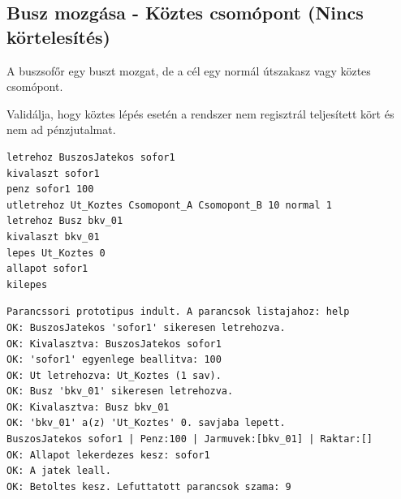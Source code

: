 \subsection{Busz mozgása - Köztes csomópont (Nincs körtelesítés)}
\begin{test-case-description}
    A buszsofőr egy buszt mozgat, de a cél egy normál útszakasz vagy köztes csomópont.
\end{test-case-description}
\begin{test-case-function}
    Validálja, hogy köztes lépés esetén a rendszer nem regisztrál teljesített kört és nem ad pénzjutalmat.
\end{test-case-function}
\begin{test-case-input}
\begin{verbatim}
letrehoz BuszosJatekos sofor1
kivalaszt sofor1
penz sofor1 100
utletrehoz Ut_Koztes Csomopont_A Csomopont_B 10 normal 1
letrehoz Busz bkv_01
kivalaszt bkv_01
lepes Ut_Koztes 0
allapot sofor1
kilepes
\end{verbatim}
\end{test-case-input}
\begin{test-case-output}
\begin{verbatim}
Parancssori prototipus indult. A parancsok listajahoz: help
OK: BuszosJatekos 'sofor1' sikeresen letrehozva.
OK: Kivalasztva: BuszosJatekos sofor1
OK: 'sofor1' egyenlege beallitva: 100
OK: Ut letrehozva: Ut_Koztes (1 sav).
OK: Busz 'bkv_01' sikeresen letrehozva.
OK: Kivalasztva: Busz bkv_01
OK: 'bkv_01' a(z) 'Ut_Koztes' 0. savjaba lepett.
BuszosJatekos sofor1 | Penz:100 | Jarmuvek:[bkv_01] | Raktar:[]
OK: Allapot lekerdezes kesz: sofor1
OK: A jatek leall.
OK: Betoltes kesz. Lefuttatott parancsok szama: 9
\end{verbatim}
\end{test-case-output}

